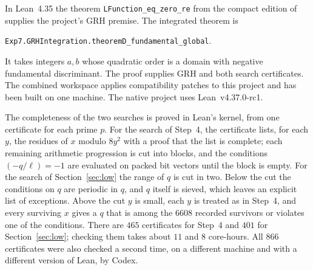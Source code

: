 \documentclass[11pt]{amsart}
\theoremstyle{remark}
\begin{document}
In Lean~4.35 the theorem \texttt{LFunction\_eq\_zero\_re} from the compact edition of \cite{GRH} supplies the project's GRH premise. The integrated theorem is
\begin{center}
\texttt{Exp7.GRHIntegration.theoremD\_fundamental\_global}.
\end{center}
It takes integers $a,b$ whose quadratic order is a domain with negative fundamental discriminant. The proof supplies GRH and both search certificates. The combined workspace applies compatibility patches to this project and has been built on one machine. The native project uses Lean~v4.37.0-rc1.

The completeness of the two searches is proved in Lean's kernel, from one certificate for each prime $p$. For the search of Step~4, the certificate lists, for each $y$, the residues of $x$ modulo $8y^2$ with a proof that the list is complete; each remaining arithmetic progression is cut into blocks, and the conditions $(-q/\ell)=-1$ are evaluated on packed bit vectors until the block is empty. For the search of Section~\ref{sec:low} the range of $q$ is cut in two. Below the cut the conditions on $q$ are periodic in $q$, and $q$ itself is sieved, which leaves an explicit list of exceptions. Above the cut $y$ is small, each $y$ is treated as in Step~4, and every surviving $x$ gives a $q$ that is among the $6608$ recorded survivors or violates one of the conditions. There are $465$ certificates for Step~4 and $401$ for Section~\ref{sec:low}; checking them takes about $11$ and $8$ core-hours. All $866$ certificates were also checked a second time, on a different machine and with a different version of Lean, by Codex.
\end{document}
